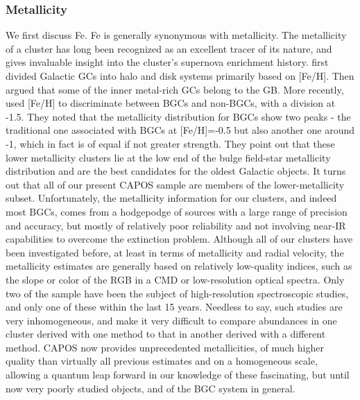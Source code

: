 \documentclass[onecolumn]{aa}
\begin{document}
\subsubsection{Metallicity}
We first discuss Fe. Fe is generally synonymous with metallicity.
The metallicity of a cluster has long been recognized as an excellent tracer of its nature, and gives invaluable insight into the cluster's supernova enrichment history. \citet{Zinn1985} first divided Galactic GCs into halo and disk systems primarily based on [Fe/H]. Then \citet{Minniti1995a} argued that some of the inner metal-rich GCs belong to the GB. More recently, \citet{Bica2016} used [Fe/H] to discriminate between BGCs and non-BGCs, with a division at -1.5. They noted that the metallicity distribution for BGCs show two peaks - the traditional one associated with BGCs at [Fe/H]=-0.5 but also another one around -1, which in fact is of equal if not greater strength. They point out that these lower metallicity clusters lie at the low end of the bulge field-star metallicity distribution and are the best candidates for the oldest Galactic objects. It turns out that all of our present CAPOS sample are members of the lower-metallicity subset. Unfortunately, the metallicity information for our clusters, and  indeed most BGCs, 
comes from a hodgepodge of sources with a large range of precision and accuracy, but mostly of relatively poor reliability and not involving near-IR capabilities to overcome the extinction problem.
Although all of our clusters have been investigated before, at least in terms of metallicity and radial velocity,  the metallicity estimates are generally based on relatively low-quality indices, such as the slope or color of the RGB in a CMD or low-resolution optical spectra. Only two of the sample have been the subject of high-resolution spectroscopic studies, and only one of these within the last 15 years. Needless to say, such studies are very inhomogeneous, and make it very difficult to compare abundances in one cluster derived with one method to that in another derived with a different method. 
CAPOS now provides unprecedented metallicities, of much higher quality than virtually all previous estimates and on a homogeneous scale, allowing a quantum leap forward in our knowledge of these fascinating, but until now very poorly studied objects, and of the BGC system in general.
\end{document}
